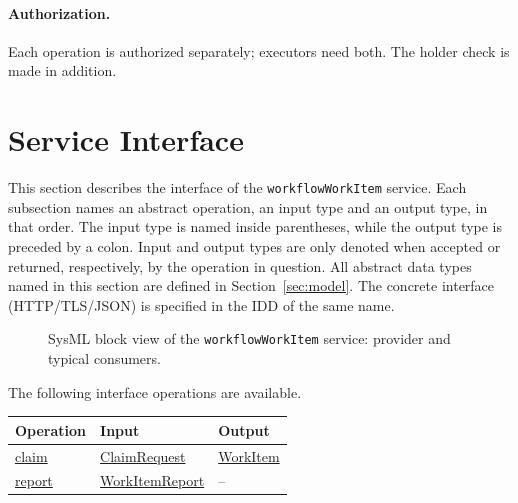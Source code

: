 \documentclass[a4paper]{arrowhead}
\newcommand{\mref}[1]{{\textcolor{ArrowheadPurple}{\hyperref[sec:model:#1]{#1}}}}
\newcommand{\oref}[1]{{\textcolor{ArrowheadBlue}{\hyperref[sec:operations:#1]{#1}}}}
\begin{document}
\paragraph{Authorization.} Each operation is authorized separately; executors need both. The holder check is made in addition.

\newpage
\section{Service Interface}
\label{sec:operations}
This section describes the interface of the \texttt{workflow\allowbreak{}Work\allowbreak{}Item} service. Each subsection names an abstract operation,
an input type and an output type, in that order. The input type is named inside parentheses, while the output type is
preceded by a colon. Input and output types are only denoted when accepted or returned, respectively, by the operation
in question. All abstract data types named in this section are defined in Section~\ref{sec:model}. The concrete
interface (HTTP/TLS/JSON) is specified in the IDD of the same name.

\begin{figure}[ht!]
  \centering
  \caption{SysML block view of the \texttt{workflowWorkItem} service: provider and typical consumers.}
  \label{fig:SD}
\end{figure}

The following interface operations are available.

{\small
\begin{longtable}{|p{4.4cm}|p{5.6cm}|p{5.8cm}|}

\hline
\rowcolor{gray!33} Operation & Input & Output \\ \hline
\endhead
\oref{claim} & \mref{ClaimRequest} & \mref{WorkItem} \\ \hline
\oref{report} & \mref{WorkItemReport} & -- \\ \hline
\end{longtable}
}
\end{document}
